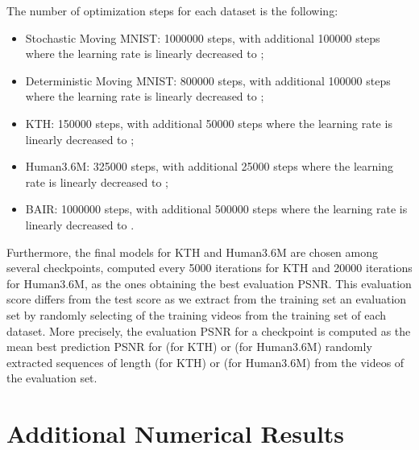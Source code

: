 \documentclass{article}
\begin{document}
The number of optimization steps for each dataset is the following:
\begin{itemize}
    \item Stochastic Moving MNIST: \num{1000000} steps, with additional \num{100000} steps where the learning rate is linearly decreased to ;
    \item Deterministic Moving MNIST: \num{800000} steps, with additional \num{100000} steps where the learning rate is linearly decreased to ;
    \item KTH: \num{150000} steps, with additional \num{50000} steps where the learning rate is linearly decreased to ;
    \item Human3.6M: \num{325000} steps, with additional \num{25000} steps where the learning rate is linearly decreased to ;
    \item BAIR: \num{1000000} steps, with additional \num{500000} steps where the learning rate is linearly decreased to .
\end{itemize}

Furthermore, the final models for KTH and Human3.6M are chosen among several checkpoints, computed every \num{5000} iterations for KTH and \num{20000} iterations for Human3.6M, as the ones obtaining the best evaluation PSNR.
This evaluation score differs from the test score as we extract from the training set an evaluation set by randomly selecting  of the training videos from the training set of each dataset.
More precisely, the evaluation PSNR for a checkpoint is computed as the mean best prediction PSNR for  (for KTH) or  (for Human3.6M) randomly extracted sequences of length  (for KTH) or  (for Human3.6M) from the videos of the evaluation set.


\section{Additional Numerical Results}
\label{app:Results}
\end{document}
